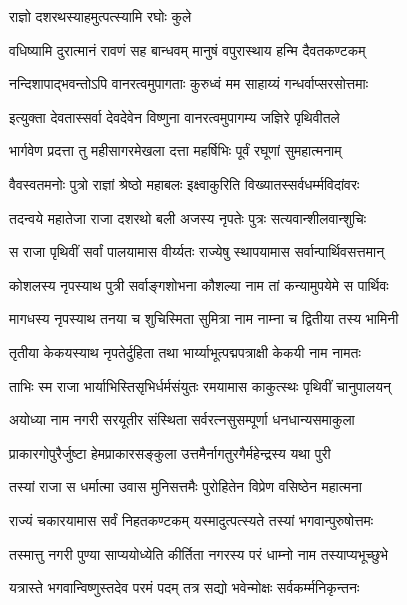 
\onelineshloka
{राज्ञो दशरथस्याहमुत्पत्स्यामि रघोः कुले}%

\twolineshloka
{वधिष्यामि दुरात्मानं रावणं सह बान्धवम्}
{मानुषं वपुरास्थाय हन्मि दैवतकण्टकम्}%

\twolineshloka
{नन्दिशापाद्भवन्तोऽपि वानरत्वमुपागताः}
{कुरुध्वं मम साहाय्यं गन्धर्वाप्सरसोत्तमाः}%


\twolineshloka
{इत्युक्ता देवतास्सर्वा देवदेवेन विष्णुना}
{वानरत्वमुपागम्य जज्ञिरे पृथिवीतले}%

\twolineshloka
{भार्गवेण प्रदत्ता तु महीसागरमेखला}
{दत्ता महर्षिभिः पूर्वं रघूणां सुमहात्मनाम्}%

\twolineshloka
{वैवस्वतमनोः पुत्रो राज्ञां श्रेष्ठो महाबलः}
{इक्ष्वाकुरिति विख्यातस्सर्वधर्म्मविदांवरः}%

\twolineshloka
{तदन्वये महातेजा राजा दशरथो बली}
{अजस्य नृपतेः पुत्रः सत्यवान्शीलवान्शुचिः}%

\twolineshloka
{स राजा पृथिवीं सर्वां पालयामास वीर्य्यतः}
{राज्येषु स्थापयामास सर्वान्पार्थिवसत्तमान्}%

\twolineshloka
{कोशलस्य नृपस्याथ पुत्री सर्वाङ्गशोभना}
{कौशल्या नाम तां कन्यामुपयेमे स पार्थिवः}%

\twolineshloka
{मागधस्य नृपस्याथ तनया च शुचिस्मिता}
{सुमित्रा नाम नाम्ना च द्वितीया तस्य भामिनी}%

\twolineshloka
{तृतीया केकयस्याथ नृपतेर्दुहिता तथा}
{भार्य्याभूत्पद्मपत्राक्षी केकयी नाम नामतः}%

\twolineshloka
{ताभिः स्म राजा भार्याभिस्तिसृभिर्धर्मसंयुतः}
{रमयामास काकुत्स्थः पृथिवीं चानुपालयन्}%

\twolineshloka
{अयोध्या नाम नगरी सरयूतीर संस्थिता}
{सर्वरत्नसुसम्पूर्णा धनधान्यसमाकुला}%

\twolineshloka
{प्राकारगोपुरैर्जुष्टा हेमप्राकारसङ्कुला}
{उत्तमैर्नागतुरगैर्महेन्द्रस्य यथा पुरी}%

\twolineshloka
{तस्यां राजा स धर्मात्मा उवास मुनिसत्तमैः}
{पुरोहितेन विप्रेण वसिष्ठेन महात्मना}%

\twolineshloka
{राज्यं चकारयामास सर्वं निहतकण्टकम्}
{यस्मादुत्पत्स्यते तस्यां भगवान्पुरुषोत्तमः}%

\twolineshloka
{तस्मात्तु नगरी पुण्या साप्ययोध्येति कीर्तिता}
{नगरस्य परं धाम्नो नाम तस्याप्यभूच्छुभे}%

\twolineshloka
{यत्रास्ते भगवान्विष्णुस्तदेव परमं पदम्}
{तत्र सद्यो भवेन्मोक्षः सर्वकर्म्मनिकृन्तनः}%

